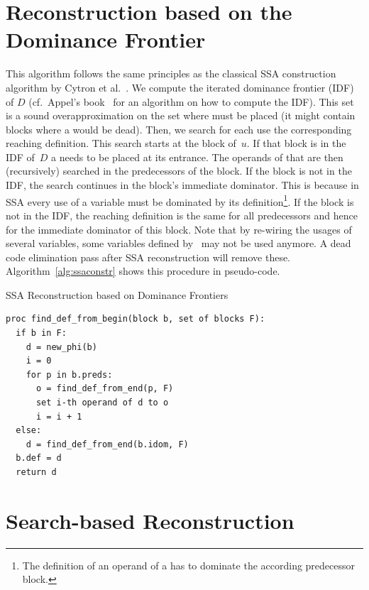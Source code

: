 \section{Reconstruction based on the Dominance Frontier}
This algorithm follows the same principles as the classical SSA construction algorithm by Cytron et al.~\cite{cytron:1991:ssa}.
We compute the iterated dominance frontier (IDF) of $D$ (cf.~Appel's book~\cite{appel:2002:modern} for an algorithm on how to compute the IDF).
This set is a sound overapproximation on the set where \phiops{} must be placed (it might contain blocks where a \phiop{} would be dead).
Then, we search for each use the corresponding reaching definition.
This search starts at the block of~$u$.
If that block is in the IDF of~$D$ a \phiop{} needs to be placed at its entrance.
The operands of that \phiop{} are then (recursively) searched in the predecessors of the block.
If the block is not in the IDF, the search continues in the block's immediate dominator. 
This is because in SSA every use of a variable must be dominated by its definition\footnote{The definition of an operand of a \phiop{} has to dominate the according predecessor block.}.
If the block is not in the IDF, the reaching definition is the same for all predecessors and hence for the immediate dominator of this block.
Note that by re-wiring the usages of several variables, some variables defined by \phiops\ may not be used anymore.
A dead code elimination pass after SSA reconstruction will remove these. 
Algorithm~\ref{alg:ssaconstr} shows this procedure in pseudo-code.

\begin{algorithm}
  \caption{SSA Reconstruction based on Dominance Frontiers}
  \label{alg:ssaconstr}
\begin{verbatim}
proc find_def_from_begin(block b, set of blocks F):
  if b in F:
    d = new_phi(b)
    i = 0
    for p in b.preds: 
      o = find_def_from_end(p, F)
      set i-th operand of d to o
      i = i + 1
  else:
    d = find_def_from_end(b.idom, F)
  b.def = d
  return d
\end{verbatim}
\end{algorithm}

\section{Search-based Reconstruction}

